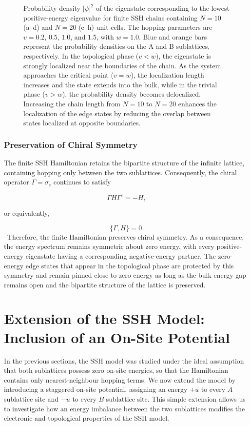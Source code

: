 \documentclass[11pt, a4paper]{article}
\begin{document}
\begin{figure}[htbp]
    \caption{Probability density $|\psi|^2$ of the eigenstate corresponding to the lowest positive-energy eigenvalue for finite SSH chains containing $N=10$ (a--d) and $N=20$ (e--h) unit cells. The hopping parameters are $v=0.2$, $0.5$, $1.0$, and $1.5$, with $w=1.0$. Blue and orange bars represent the probability densities on the A and B sublattices, respectively. In the topological phase ($v<w$), the eigenstate is strongly localized near the boundaries of the chain. As the system approaches the critical point ($v=w$), the localization length increases and the state extends into the bulk, while in the trivial phase ($v>w$), the probability density becomes delocalized. Increasing the chain length from $N=10$ to $N=20$ enhances the localization of the edge states by reducing the overlap between states localized at opposite boundaries.}
    \label{fig:probability_n=10_20}
\end{figure}


\subsubsection{Preservation of Chiral Symmetry}

The finite SSH Hamiltonian retains the bipartite structure of the infinite lattice, containing hopping only between the two sublattices. Consequently, the chiral operator
\(\Gamma=\sigma_z\) continues to satisfy

\[
\Gamma H \Gamma^\dagger=-H,
\]

or equivalently,

\[
\{\Gamma,H\}=0.
\]
\
Therefore, the finite Hamiltonian preserves chiral symmetry. As a consequence, the energy spectrum remains symmetric about zero energy, with every positive-energy eigenstate having a corresponding negative-energy partner. The zero-energy edge states that appear in the topological phase are protected by this symmetry and remain pinned close to zero energy as long as the bulk energy gap remains open and the bipartite structure of the lattice is preserved.

\section{Extension of the SSH Model: Inclusion of an On-Site Potential}
\sectionmark{SSH Model with On-Site Potential}
\label{sec:onsite_potential}

In the previous sections, the SSH model was studied under the ideal
assumption that both sublattices possess zero on-site energies, so that
the Hamiltonian contains only nearest-neighbour hopping terms. We now extend
the model by introducing a staggered on-site potential, assigning an energy
$+u$ to every $A$ sublattice site and $-u$ to every $B$ sublattice site.
This simple extension allows us to investigate how an energy imbalance
between the two sublattices modifies the electronic and topological
properties of the SSH model.
\end{document}
